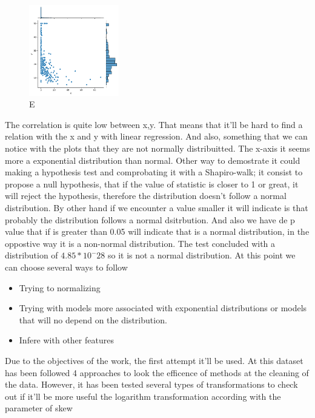 \documentclass{article}
\begin{document}
\begin{figure}[h]
  \centering
  \includegraphics[width=0.35\textwidth]{data1_plot1.png}
  \caption{E}
  \label{fig:ejemplo}
\end{figure}


The correlation is quite low between x,y. That means that it'll be hard to find a relation with the x and y with linear regression.
And also, something that we can notice with the plots that they are not normally distribuitted. The x-axis it seems more a exponential distribution than normal.
Other way to demostrate it could making a hypothesis test and comprobating it with a Shapiro-walk; it consist to propose a null hypothesis, that if the value of statistic is closer to 1 or great, it will reject the hypothesis, therefore the distribution doesn't follow a normal distribution. By other hand if we encounter a value smaller it will indicate is that probably the distribution follows a normal dsitrbution. And also we have de p value that if is greater than 0.05 will indicate that is a normal distribution, in the oppostive way it is a non-normal distribution.
The test concluded with a distribution of  $4.85*10^-28$ so it is not a normal distribution.
At this point we can choose several ways to follow
\begin{itemize}
  \item Trying to normalizing
  \item Trying with models more associated with exponential distributions or models that will no depend on the distribution.
  \item Infere with other features
\end{itemize} 
Due to the objectives of the work, the first attempt it'll be used.
At this dataset has been followed 4 approaches to look the efficence of methods at the cleaning of the data.
However, it has been tested several types of transformations to check out if it'll be more useful the logarithm transformation according with the parameter of skew 
\end{document}
